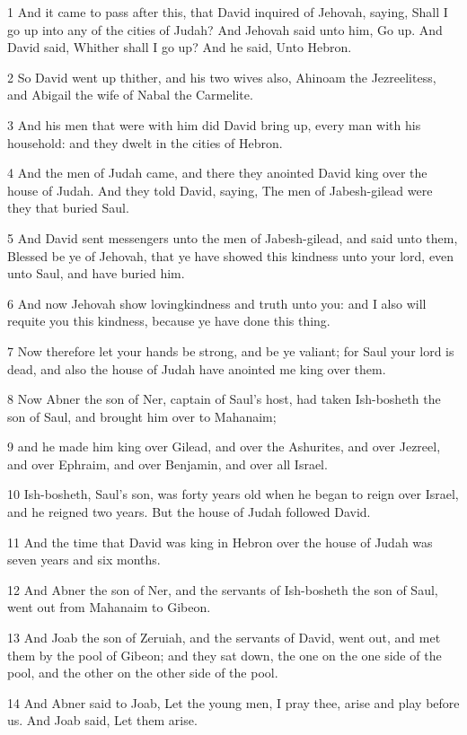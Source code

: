 \par 1 And it came to pass after this, that David inquired of Jehovah, saying, Shall I go up into any of the cities of Judah? And Jehovah said unto him, Go up. And David said, Whither shall I go up? And he said, Unto Hebron.
\par 2 So David went up thither, and his two wives also, Ahinoam the Jezreelitess, and Abigail the wife of Nabal the Carmelite.
\par 3 And his men that were with him did David bring up, every man with his household: and they dwelt in the cities of Hebron.
\par 4 And the men of Judah came, and there they anointed David king over the house of Judah. And they told David, saying, The men of Jabesh-gilead were they that buried Saul.
\par 5 And David sent messengers unto the men of Jabesh-gilead, and said unto them, Blessed be ye of Jehovah, that ye have showed this kindness unto your lord, even unto Saul, and have buried him.
\par 6 And now Jehovah show lovingkindness and truth unto you: and I also will requite you this kindness, because ye have done this thing.
\par 7 Now therefore let your hands be strong, and be ye valiant; for Saul your lord is dead, and also the house of Judah have anointed me king over them.
\par 8 Now Abner the son of Ner, captain of Saul's host, had taken Ish-bosheth the son of Saul, and brought him over to Mahanaim;
\par 9 and he made him king over Gilead, and over the Ashurites, and over Jezreel, and over Ephraim, and over Benjamin, and over all Israel.
\par 10 Ish-bosheth, Saul's son, was forty years old when he began to reign over Israel, and he reigned two years. But the house of Judah followed David.
\par 11 And the time that David was king in Hebron over the house of Judah was seven years and six months.
\par 12 And Abner the son of Ner, and the servants of Ish-bosheth the son of Saul, went out from Mahanaim to Gibeon.
\par 13 And Joab the son of Zeruiah, and the servants of David, went out, and met them by the pool of Gibeon; and they sat down, the one on the one side of the pool, and the other on the other side of the pool.
\par 14 And Abner said to Joab, Let the young men, I pray thee, arise and play before us. And Joab said, Let them arise.
